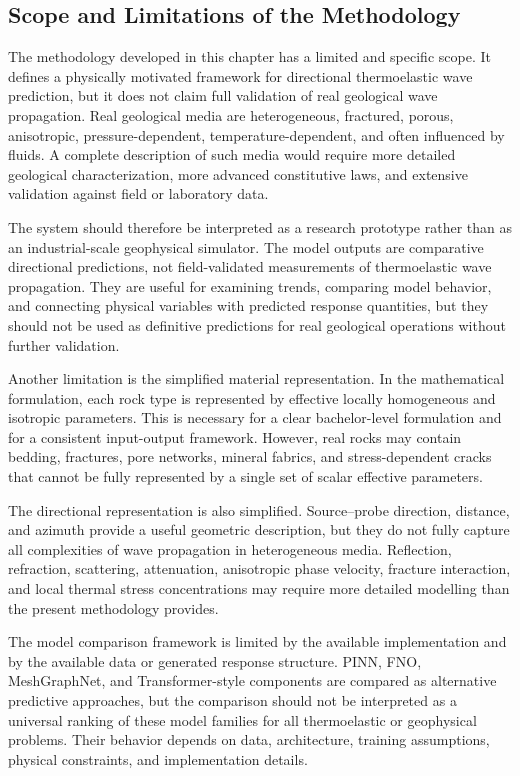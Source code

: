 \subsection{Scope and Limitations of the Methodology}

The methodology developed in this chapter has a limited and specific scope. It defines a physically motivated framework for directional thermoelastic wave prediction, but it does not claim full validation of real geological wave propagation. Real geological media are heterogeneous, fractured, porous, anisotropic, pressure-dependent, temperature-dependent, and often influenced by fluids. A complete description of such media would require more detailed geological characterization, more advanced constitutive laws, and extensive validation against field or laboratory data.

The system should therefore be interpreted as a research prototype rather than as an industrial-scale geophysical simulator. The model outputs are comparative directional predictions, not field-validated measurements of thermoelastic wave propagation. They are useful for examining trends, comparing model behavior, and connecting physical variables with predicted response quantities, but they should not be used as definitive predictions for real geological operations without further validation.

Another limitation is the simplified material representation. In the mathematical formulation, each rock type is represented by effective locally homogeneous and isotropic parameters. This is necessary for a clear bachelor-level formulation and for a consistent input-output framework. However, real rocks may contain bedding, fractures, pore networks, mineral fabrics, and stress-dependent cracks that cannot be fully represented by a single set of scalar effective parameters.

The directional representation is also simplified. Source--probe direction, distance, and azimuth provide a useful geometric description, but they do not fully capture all complexities of wave propagation in heterogeneous media. Reflection, refraction, scattering, attenuation, anisotropic phase velocity, fracture interaction, and local thermal stress concentrations may require more detailed modelling than the present methodology provides.

The model comparison framework is limited by the available implementation and by the available data or generated response structure. PINN, FNO, MeshGraphNet, and Transformer-style components are compared as alternative predictive approaches, but the comparison should not be interpreted as a universal ranking of these model families for all thermoelastic or geophysical problems. Their behavior depends on data, architecture, training assumptions, physical constraints, and implementation details.

